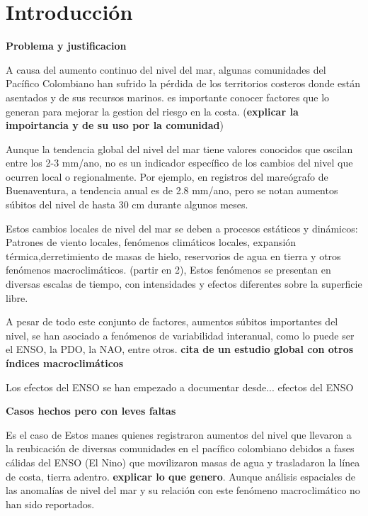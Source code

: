 \chapter{Introducci\'{o}n}

\textbf{Problema y justificacion}

A causa del aumento continuo del nivel del mar, algunas comunidades del Pac\'{i}fico Colombiano han sufrido la p\'{e}rdida de los territorios costeros donde est\'{a}n asentados y de sus recursos marinos. es importante conocer factores que lo generan para mejorar la gestion del riesgo en la costa. (\textbf{explicar la impoirtancia y de su uso por la comunidad})

Aunque la tendencia global del nivel del mar tiene valores conocidos que oscilan entre los 2-3 mm/ano, no es un indicador espec\'{i}fico de los cambios del nivel que ocurren local o regionalmente. Por ejemplo, en registros del mare\'{o}grafo de Buenaventura, a tendencia anual es de 2.8 mm/ano, pero se notan aumentos s\'{u}bitos del nivel de hasta 30 cm durante algunos meses.

Estos cambios locales de nivel del mar se deben a procesos est\'{a}ticos y din\'{a}micos: Patrones de viento locales, fen\'{o}menos clim\'{a}ticos locales, expansi\'{o}n t\'{e}rmica,derretimiento de masas de hielo, reservorios de agua en tierra y otros fen\'{o}menos macroclim\'{a}ticos. (partir en 2), Estos fen\'{o}menos se presentan en diversas escalas de tiempo, con intensidades y efectos diferentes sobre la superficie libre.

A pesar de todo este conjunto de factores, aumentos s\'{u}bitos importantes del nivel, se han  asociado a fen\'{o}menos de variabilidad interanual, como lo puede ser el ENSO, la PDO, la NAO, entre otros.  \textbf{cita de un estudio global con otros \'{i}ndices macroclim\'{a}ticos}

Los efectos del ENSO se han empezado a documentar desde... efectos del ENSO

\vspace{3mm}

\textbf{Casos hechos pero con leves faltas}

Es el caso de Estos manes quienes registraron aumentos del nivel que llevaron a la reubicaci\'{o}n de diversas comunidades en el pac\'{i}fico colombiano debidos a fases c\'{a}lidas del ENSO (El Nino) que movilizaron masas de agua y trasladaron la línea de costa, tierra adentro. \textbf{explicar lo que genero}. Aunque an\'{a}lisis espaciales de las anomal\'{i}as de nivel del mar y su relaci\'{o}n con este fen\'{o}meno macroclim\'{a}tico no han sido reportados.

